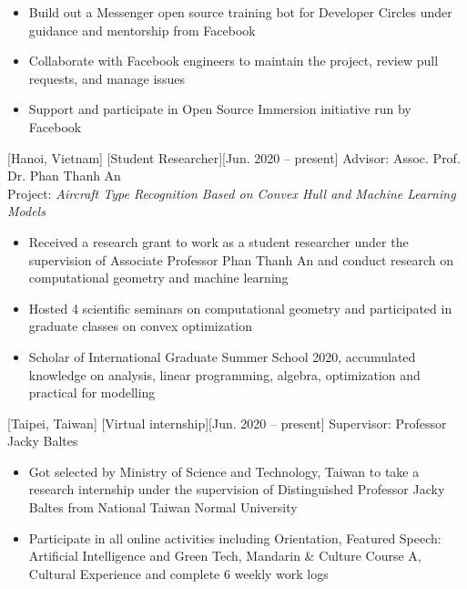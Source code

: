 \documentclass{article}
\begin{document}
\begin{itemize}
\item Build out a Messenger open source training bot for Developer Circles under guidance and mentorship from Facebook
\item Collaborate with Facebook engineers to maintain the project, review pull requests, and manage issues
\item Support and participate in Open Source Immersion initiative run by Facebook
\end{itemize}

[Hanoi, Vietnam]
[Student Researcher][Jun. 2020 – present]
Advisor: Assoc. Prof. Dr. Phan Thanh An
\\ Project: \textit{Aircraft Type Recognition Based on Convex Hull and Machine Learning Models}
\\[-0.6cm]
\begin{itemize}
\item Received a research grant to work as a student researcher under the supervision of Associate Professor Phan Thanh An and conduct research on computational geometry and machine learning
\item Hosted 4 scientific seminars on computational geometry and participated in graduate classes on convex optimization
\item Scholar of International Graduate Summer School 2020, accumulated knowledge on analysis, linear programming, algebra, optimization and practical for modelling
\end{itemize}

[Taipei, Taiwan]
[Virtual internship][Jun. 2020 – present]
Supervisor: Professor Jacky Baltes
\\[-0.6cm]
\begin{itemize}
\item Got selected by Ministry of Science and Technology, Taiwan to take a research internship under the supervision of Distinguished Professor Jacky Baltes from National Taiwan Normal University
\item Participate in all online activities including Orientation, Featured Speech: Artificial Intelligence and Green Tech, Mandarin \& Culture Course A, Cultural Experience and complete 6 weekly work logs
\end{itemize}
\end{document}
